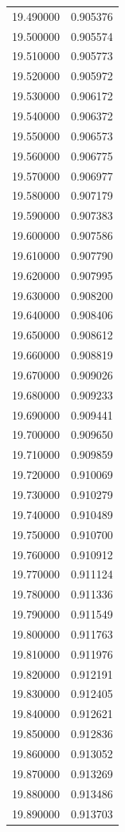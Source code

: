 \begin{tabular}{rr}
19.490000 & 0.905376 \\
19.500000 & 0.905574 \\
19.510000 & 0.905773 \\
19.520000 & 0.905972 \\
19.530000 & 0.906172 \\
19.540000 & 0.906372 \\
19.550000 & 0.906573 \\
19.560000 & 0.906775 \\
19.570000 & 0.906977 \\
19.580000 & 0.907179 \\
19.590000 & 0.907383 \\
19.600000 & 0.907586 \\
19.610000 & 0.907790 \\
19.620000 & 0.907995 \\
19.630000 & 0.908200 \\
19.640000 & 0.908406 \\
19.650000 & 0.908612 \\
19.660000 & 0.908819 \\
19.670000 & 0.909026 \\
19.680000 & 0.909233 \\
19.690000 & 0.909441 \\
19.700000 & 0.909650 \\
19.710000 & 0.909859 \\
19.720000 & 0.910069 \\
19.730000 & 0.910279 \\
19.740000 & 0.910489 \\
19.750000 & 0.910700 \\
19.760000 & 0.910912 \\
19.770000 & 0.911124 \\
19.780000 & 0.911336 \\
19.790000 & 0.911549 \\
19.800000 & 0.911763 \\
19.810000 & 0.911976 \\
19.820000 & 0.912191 \\
19.830000 & 0.912405 \\
19.840000 & 0.912621 \\
19.850000 & 0.912836 \\
19.860000 & 0.913052 \\
19.870000 & 0.913269 \\
19.880000 & 0.913486 \\
19.890000 & 0.913703 \\

\end{tabular}
